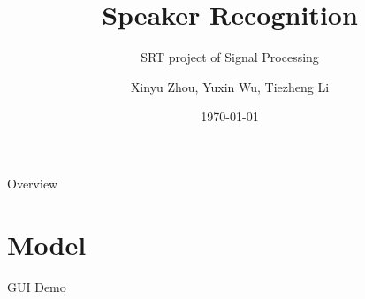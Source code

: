 \documentclass {beamer}
\title{Speaker Recognition}
\subtitle{SRT project of Signal Processing}
\author {Xinyu Zhou, Yuxin Wu, Tiezheng Li}
\institute{
  Department of Computer Science and Technology\\
  Tsinghua University\\
}
\date{\today}
\theoremstyle{plain}
\begin{document}
\frame[plain]{\titlepage}

\begin{frame}{Overview}
\tableofcontents
\end{frame}



\section{Model}


%
\begin{frame}{GUI Demo}

\end{frame}
\end{document}
